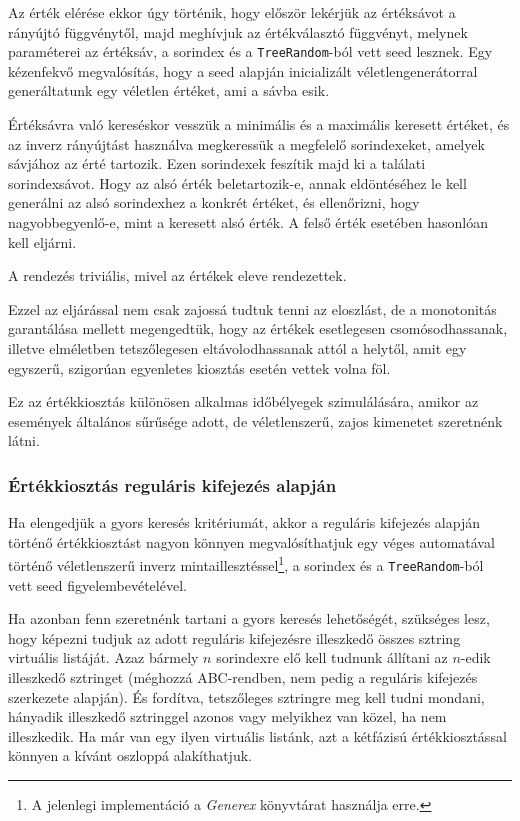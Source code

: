 \documentclass[
    parspace,
    noindent,
    nohyp,
]{elteiktdk}[2023/04/10]
\begin{document}
Az érték elérése ekkor úgy történik, hogy először lekérjük az értéksávot a rányújtó függvénytől,
majd meghívjuk az értékválasztó függvényt,
melynek paraméterei az értéksáv, a sorindex és a \texttt{TreeRandom}-ból vett seed lesznek.
Egy kézenfekvő megvalósítás,
hogy a seed alapján inicializált véletlengenerátorral
generáltatunk egy véletlen értéket, ami a sávba esik.

Értéksávra való kereséskor vesszük a minimális és a maximális keresett értéket,
és az inverz rányújtást használva megkeressük a megfelelő sorindexeket, amelyek sávjához az érté tartozik.
Ezen sorindexek feszítik majd ki a találati sorindexsávot.
Hogy az alsó érték beletartozik-e, annak eldöntéséhez le kell generálni
az alsó sorindexhez a konkrét értéket, és ellenőrizni, hogy nagyobbegyenlő-e,
mint a keresett alsó érték.
A felső érték esetében hasonlóan kell eljárni.

A rendezés triviális, mivel az értékek eleve rendezettek.

Ezzel az eljárással nem csak zajossá tudtuk tenni az eloszlást,
de a monotonitás garantálása mellett megengedtük,
hogy az értékek esetlegesen csomósodhassanak,
illetve elméletben tetszőlegesen eltávolodhassanak attól a helytől,
amit egy egyszerű, szigorúan egyenletes kiosztás esetén vettek volna föl.

Ez az értékkiosztás különösen alkalmas időbélyegek szimulálására,
amikor az események általános sűrűsége adott,
de véletlenszerű, zajos kimenetet szeretnénk látni.

\subsubsection{Értékkiosztás reguláris kifejezés alapján}

Ha elengedjük a gyors keresés kritériumát,
akkor a reguláris kifejezés alapján történő értékkiosztást nagyon könnyen megvalósíthatjuk
egy véges automatával történő véletlenszerű inverz mintaillesztéssel\footnote{
  A jelenlegi implementáció a \textit{Generex} könyvtárat használja erre.
},
a sorindex és a \texttt{TreeRandom}-ból vett seed figyelembevételével.

Ha azonban fenn szeretnénk tartani a gyors keresés lehetőségét,
szükséges lesz, hogy képezni tudjuk az adott reguláris kifejezésre illeszkedő összes sztring virtuális listáját.
Azaz bármely $n$ sorindexre elő kell tudnunk állítani az $n$-edik illeszkedő sztringet
(méghozzá ABC-rendben, nem pedig a reguláris kifejezés szerkezete alapján).
És fordítva, tetszőleges sztringre meg kell tudni mondani,
hányadik illeszkedő sztringgel azonos vagy melyikhez van közel, ha nem illeszkedik.
Ha már van egy ilyen virtuális listánk, azt a kétfázisú értékkiosztással könnyen a kívánt oszloppá alakíthatjuk.
\end{document}
